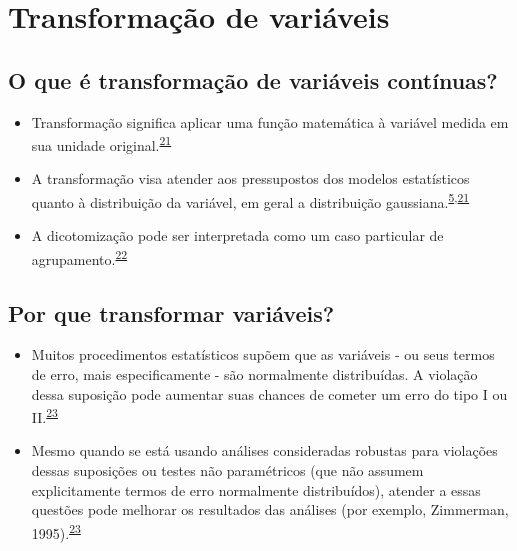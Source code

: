\documentclass[
]{book}
\begin{document}
\hypertarget{transformacao}{%
\section{Transformação de variáveis}\label{transformacao}}

\hypertarget{o-que-uxe9-transformauxe7uxe3o-de-variuxe1veis-contuxednuas}{%
\subsection{O que é transformação de variáveis contínuas?}\label{o-que-uxe9-transformauxe7uxe3o-de-variuxe1veis-contuxednuas}}

\begin{itemize}
\item
  Transformação significa aplicar uma função matemática à variável medida em sua unidade original.\textsuperscript{\protect\hyperlink{ref-Bland1996}{21}}
\item
  A transformação visa atender aos pressupostos dos modelos estatísticos quanto à distribuição da variável, em geral a distribuição gaussiana.\textsuperscript{\protect\hyperlink{ref-vetter2017}{5},\protect\hyperlink{ref-Bland1996}{21}}
\item
  A dicotomização pode ser interpretada como um caso particular de agrupamento.\textsuperscript{\protect\hyperlink{ref-Fedorov2009}{22}}
\end{itemize}

\hypertarget{por-que-transformar-variuxe1veis}{%
\subsection{Por que transformar variáveis?}\label{por-que-transformar-variuxe1veis}}

\begin{itemize}
\item
  Muitos procedimentos estatísticos supõem que as variáveis - ou seus termos de erro, mais especificamente - são normalmente distribuídas. A violação dessa suposição pode aumentar suas chances de cometer um erro do tipo I ou II.\textsuperscript{\protect\hyperlink{ref-osborne2010}{23}}
\item
  Mesmo quando se está usando análises consideradas robustas para violações dessas suposições ou testes não paramétricos (que não assumem explicitamente termos de erro normalmente distribuídos), atender a essas questões pode melhorar os resultados das análises (por exemplo, Zimmerman, 1995).\textsuperscript{\protect\hyperlink{ref-osborne2010}{23}}
\end{itemize}
\end{document}
